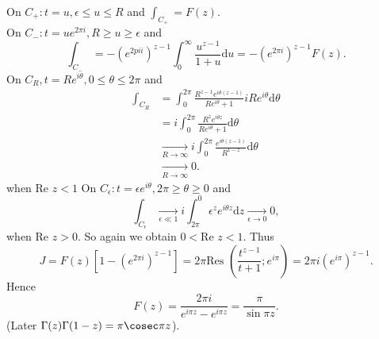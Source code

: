 \documentclass[a4paper]{article}
\begin{document}
\begin{eg}
\begin{itemize}
\begin{center}
  \end{center}
  On $C_+ : t  = u , \epsilon \le u \le R$ and $\int_{C_+} = F(z)$. \\
  On $C_- : t = u e^{ 2 \pi i} , R \ge u \ge \epsilon$ and
  \[
      \int_{C_-} = - (e^{ 2 pi i})^{  z - 1} \int_0^{\infty} \frac{u^{ z - 1}}{ 1 + u} \text{d} u = - (e^{2 \pi i})^{ z - 1} F(z)
  .\] 
  On $C_R, t = R e^{ i \theta}, 0 \le \theta \le 2 \pi $ and
    \begin{align*}
      \int_{C_R}  &= \int_0^{ 2 \pi} \frac{ R^{ z - 1} e^{ i \theta (z - 1)}}{ R e^{ i \theta} + 1} i R e^{ i \theta} \text{d} \theta \\
      &=  i \int_0^{ 2 \pi} \frac{R^{ z } e^{ i \theta z}}{ R e^{ i \theta} + 1} \text{d} \theta\\
      &\underset{R \to \infty}{\to} i \int_0^{ 2 \pi} \frac{e^{ i \theta (z-1)}}{R^{ 1 - z}} \text{d} \theta \\
      & \underset{R \to \infty}{\to} 0
  .\end{align*}
  when $\text{Re } z < 1$ 
  On $C_{\epsilon} : t = \epsilon e^{ i \theta}, 2\pi \ge \theta \ge 0$ and
  \[
      \int_{C_{\epsilon} } \underset{ \epsilon \ll 1 }{\to} i \int_{2 \pi}^{ 0} \epsilon^{z} e^{ i \theta z} \text{d}z \underset{\epsilon \to 0}{\to} 0
  ,\]
  when $\text{Re } z > 0$. So again we obtain $0 < \text{Re } z < 1$. Thus
  \[
      J = F(z) [ 1 - (e^{ 2 \pi i})^{ z - 1}] = 2\pi \text{Res }\left( \frac{t ^{ z - 1}}{t + 1} ; e^{ i \pi} \right)  = 2\pi i (e^{ i \pi})^{ z - 1} 
  .\] 
  Hence
  \[
      F(z) = \frac{2 \pi i}{ e^{i \pi z} - e^{ i \pi z}} = \frac{ \pi}{ \sin \pi z}
  .\] 
  (Later $\Gamma (z) \Gamma( 1 - z) = \pi \cosec \pi z$).
    \end{itemize}
\end{eg}
\end{document}
